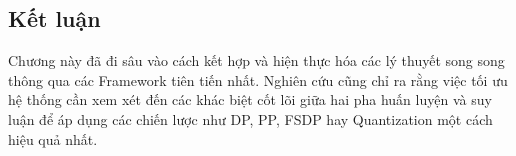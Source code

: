 \subsection{Kết luận}
Chương này đã đi sâu vào cách kết hợp và hiện thực hóa các lý thuyết song song thông qua các Framework tiên tiến nhất. Nghiên cứu cũng chỉ ra rằng việc tối ưu hệ thống cần xem xét đến các khác biệt cốt lõi giữa hai pha huấn luyện và suy luận để áp dụng các chiến lược như DP, PP, FSDP hay Quantization một cách hiệu quả nhất.